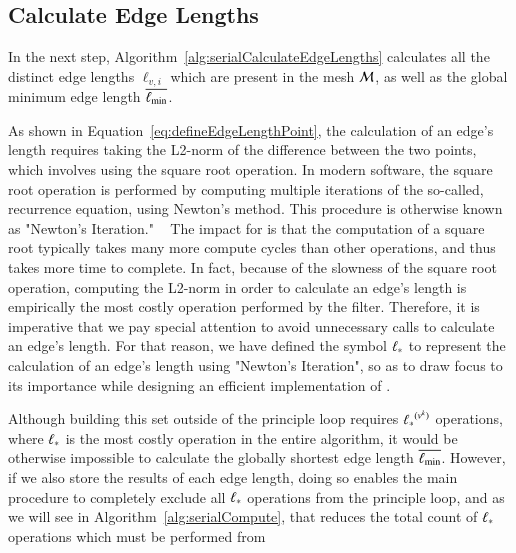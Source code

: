
%
%
%
\subsection{Calculate Edge Lengths}
\label{ch5sSIssCEL}
In the next step, Algorithm~\ref{alg:serialCalculateEdgeLengths} calculates all the distinct edge lengths $\ell_{v,i}$ which are present in the mesh $\mathcal{M}$, as well as the global minimum edge length $\overline{\ell_\text{min}}$.

As shown in Equation~\ref{eq:defineEdgeLengthPoint}, the calculation of an edge's length requires taking the L2-norm of the difference between the two points, which involves using the square root operation. In modern software, the square root operation is performed by computing multiple iterations of the so-called, recurrence equation, using Newton's method. This procedure is otherwise known as "Newton's Iteration." ~\cite{Weisstein19b} The impact for  is that the computation of a square root typically takes many more compute cycles than other operations, and thus takes more time to complete. In fact, because of the slowness of the square root operation, computing the L2-norm in order to calculate an edge's length is empirically the most costly operation performed by the filter. Therefore, it is imperative that we pay special attention to avoid unnecessary calls to calculate an edge's length. For that reason, we have defined the symbol $\ell_\ast$ to represent the calculation of an edge's length using "Newton's Iteration", so as to draw focus to its importance while designing an efficient implementation of .

Although building this set outside of the principle loop requires ${\ell_\ast}^{(v^k)}$ operations, where $\ell_\ast$ is the most costly operation in the entire algorithm, it would be otherwise impossible to calculate the globally shortest edge length $\overline{\ell_\text{min}}$. However, if we also store the results of each edge length, doing so enables the main procedure to completely exclude all $\ell_\ast$ operations from the principle loop, and as we will see in Algorithm~\ref{alg:serialCompute}, that reduces the total count of $\ell_\ast$ operations which must be performed from

